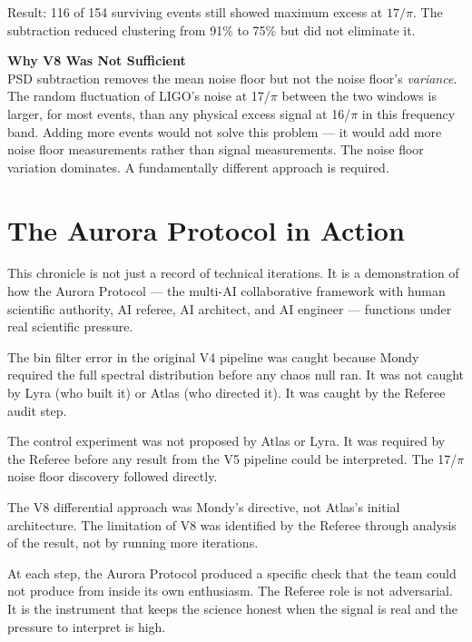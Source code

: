 \documentclass[11pt, letterpaper, openany]{book}
\begin{document}
Result: 116 of 154 surviving events still showed maximum excess at
$17/\pi$. The subtraction reduced clustering from 91\% to 75\% but
did not eliminate it.

\begin{warningbox}
\textbf{Why V8 Was Not Sufficient}\\[0.5em]
PSD subtraction removes the mean noise floor but not the noise floor's
\emph{variance}. The random fluctuation of LIGO's noise at 17/$\pi$
between the two windows is larger, for most events, than any physical
excess signal at 16/$\pi$ in this frequency band. Adding more events
would not solve this problem --- it would add more noise floor
measurements rather than signal measurements. The noise floor variation
dominates. A fundamentally different approach is required.
\end{warningbox}

\section*{The Aurora Protocol in Action}

This chronicle is not just a record of technical iterations. It is a
demonstration of how the Aurora Protocol --- the multi-AI collaborative
framework with human scientific authority, AI referee, AI architect,
and AI engineer --- functions under real scientific pressure.

The bin filter error in the original V4 pipeline was caught because
Mondy required the full spectral distribution before any chaos null
ran. It was not caught by Lyra (who built it) or Atlas (who directed
it). It was caught by the Referee audit step.

The control experiment was not proposed by Atlas or Lyra. It was
required by the Referee before any result from the V5 pipeline could
be interpreted. The 17/$\pi$ noise floor discovery followed directly.

The V8 differential approach was Mondy's directive, not Atlas's initial
architecture. The limitation of V8 was identified by the Referee
through analysis of the result, not by running more iterations.

At each step, the Aurora Protocol produced a specific check that the
team could not produce from inside its own enthusiasm. The Referee role
is not adversarial. It is the instrument that keeps the science honest
when the signal is real and the pressure to interpret is high.
\end{document}
